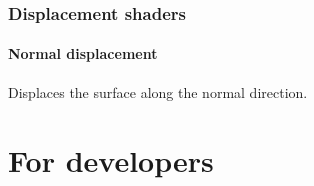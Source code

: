 \documentclass{book}
\begin{document}

\subsection{Displacement shaders}
\subsubsection{Normal displacement}
Displaces the surface along the normal direction. 



\chapter{For developers}

%
%
%
%
%
%
\end{document}
